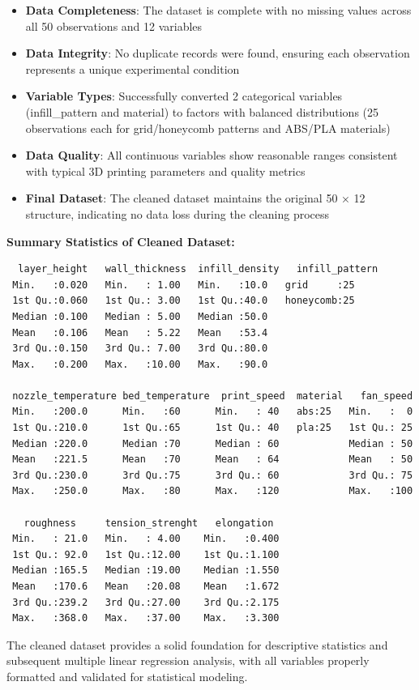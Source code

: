 \begin{itemize}
    \item \textbf{Data Completeness}: The dataset is complete with no missing values across all 50 observations and 12 variables
    \item \textbf{Data Integrity}: No duplicate records were found, ensuring each observation represents a unique experimental condition
    \item \textbf{Variable Types}: Successfully converted 2 categorical variables (infill\_pattern and material) to factors with balanced distributions (25 observations each for grid/honeycomb patterns and ABS/PLA materials)
    \item \textbf{Data Quality}: All continuous variables show reasonable ranges consistent with typical 3D printing parameters and quality metrics
    \item \textbf{Final Dataset}: The cleaned dataset maintains the original 50 × 12 structure, indicating no data loss during the cleaning process
\end{itemize}

\textbf{Summary Statistics of Cleaned Dataset:}
\begin{verbatim}
  layer_height   wall_thickness  infill_density   infill_pattern
 Min.   :0.020   Min.   : 1.00   Min.   :10.0   grid     :25    
 1st Qu.:0.060   1st Qu.: 3.00   1st Qu.:40.0   honeycomb:25    
 Median :0.100   Median : 5.00   Median :50.0                   
 Mean   :0.106   Mean   : 5.22   Mean   :53.4                   
 3rd Qu.:0.150   3rd Qu.: 7.00   3rd Qu.:80.0                   
 Max.   :0.200   Max.   :10.00   Max.   :90.0                   

 nozzle_temperature bed_temperature  print_speed  material   fan_speed  
 Min.   :200.0      Min.   :60      Min.   : 40   abs:25   Min.   :  0  
 1st Qu.:210.0      1st Qu.:65      1st Qu.: 40   pla:25   1st Qu.: 25  
 Median :220.0      Median :70      Median : 60            Median : 50  
 Mean   :221.5      Mean   :70      Mean   : 64            Mean   : 50  
 3rd Qu.:230.0      3rd Qu.:75      3rd Qu.: 60            3rd Qu.: 75  
 Max.   :250.0      Max.   :80      Max.   :120            Max.   :100  

   roughness     tension_strenght   elongation   
 Min.   : 21.0   Min.   : 4.00    Min.   :0.400  
 1st Qu.: 92.0   1st Qu.:12.00    1st Qu.:1.100  
 Median :165.5   Median :19.00    Median :1.550  
 Mean   :170.6   Mean   :20.08    Mean   :1.672  
 3rd Qu.:239.2   3rd Qu.:27.00    3rd Qu.:2.175  
 Max.   :368.0   Max.   :37.00    Max.   :3.300  
\end{verbatim}

The cleaned dataset provides a solid foundation for descriptive statistics and subsequent multiple linear regression analysis, with all variables properly formatted and validated for statistical modeling.